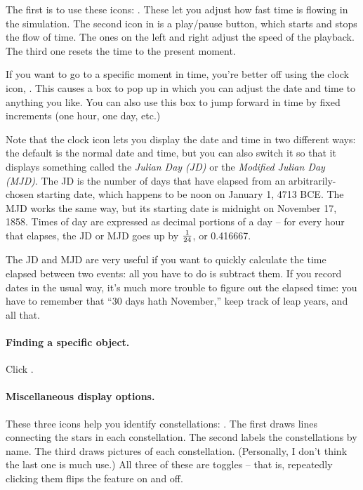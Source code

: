 The first is to use these icons: 
. These let you adjust
how fast time is flowing in the simulation.
The second icon in is a play/pause button, which starts and stops the flow
of time. The ones on the left and right adjust the speed of the playback.
The third one resets the time to the present moment.

If you want to go to a specific moment in time, you're better off
using the clock icon, . This causes a
box to pop up in which you can adjust the date and time to anything
you like. You can also use this box to jump forward in time by fixed
increments (one hour, one day, etc.)

Note that the clock icon lets you display the date and time in two different
ways: the default is the normal date and time, but you can also
switch it so that it displays something called the \textit{Julian Day (JD)}
or the \textit{Modified Julian Day (MJD)}. 
The JD is  the number of days that have elapsed from an
arbitrarily-chosen starting date, which happens to be noon on
January 1, 4713 BCE.
The MJD works the same way, but its starting date is midnight
on November
17, 1858. Times of day are expressed as decimal portions of a day --
for every hour that elapses, the JD or MJD goes up by ${1\over 24}$, or
0.416667.

The JD and MJD are very useful if you want to quickly calculate the
time elapsed between two events: all you have to do is subtract them.
If you record dates in the usual way, it's much more trouble
to figure out the elapsed time: you have to remember that ``30 days hath
November,'' keep track of leap years, and all that.

\paragraph{Finding a specific object.} Click .

\paragraph{Miscellaneous display options.} 

These three icons help you identify
constellations: . The first draws lines connecting
the stars in each constellation. The second labels the constellations by
name. The third draws pictures of each constellation. (Personally, I
don't think the last one is much use.) All three of these are toggles --
that is, repeatedly clicking them flips the feature on and off.

